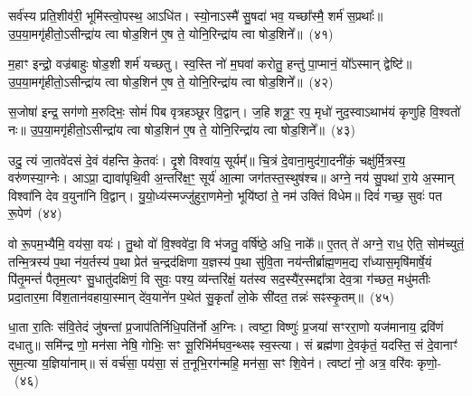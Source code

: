 {\anuvakamend[{असा॑वि स॒प्तविꣳ॑शतिः}]}%

सर्व॑स्य प्रति॒शीव॑री॒ भूमि॑स्त्वो॒पस्थ॒ आ\-ऽधि॑त। स्यो॒ना\-ऽस्मै॑ सु॒षदा॑ भव॒ यच्छा᳚स्मै॒ शर्म॑ स॒प्रथाः᳚॥ उ॒प॒या॒मगृ॑हीतो॒\-ऽसीन्द्रा॑य त्वा षोड॒शिन॑ ए॒ष ते॒ योनि॒रिन्द्रा॑य त्वा षोड॒शिने᳚॥~(४१)\ip

{\anuvakamend[{सर्व॑स्य॒ षड्विꣳ॑शतिः}]}%

म॒हाꣳ इन्द्रो॒ वज्र॑बाहुः षोड॒शी शर्म॑ यच्छतु। स्व॒स्ति नो॑ म॒घवा॑ करोतु॒ हन्तु॑ पा॒प्मानं॒ यो᳚\-ऽस्मान् द्वेष्टि॑॥ उ॒प॒या॒मगृ॑हीतो॒\-ऽसीन्द्रा॑य त्वा षोड॒शिन॑ ए॒ष ते॒ योनि॒रिन्द्रा॑य त्वा षोड॒शिने᳚॥~(४२)\ip

{\anuvakamend[{सर्व॑स्य म॒हान्थ्षड्विꣳ॑शतिः॒ षड्विꣳ॑शतिः}]}%

स॒जोषा॑ इन्द्र॒ सग॑णो म॒रुद्भिः॒ सोमं॑ पिब वृत्रहञ्छूर वि॒द्वान्। ज॒हि शत्रू॒ꣳ॒ रप॒ मृधो॑ नुद॒स्वा\-ऽथाभ॑यं कृणुहि वि॒श्वतो॑ नः॥ उ॒प॒या॒मगृ॑हीतो॒\-ऽसीन्द्रा॑य त्वा षोड॒शिन॑ ए॒ष ते॒ योनि॒रिन्द्रा॑य त्वा षोड॒शिने᳚॥~(४३)\ip

{\anuvakamend[{स॒जोषा᳚स्त्रि॒ꣳ॒शत्}]}%

उदु॒ त्यं जा॒तवे॑दसं दे॒वं व॑हन्ति के॒तवः॑। दृ॒शे विश्वा॑य॒ सूर्यम्᳚॥ चि॒त्रं दे॒वाना॒मुद॑गा॒दनी॑कं॒ चक्षु॑र्मि॒त्रस्य॒ वरु॑णस्या॒ग्नेः। आ\-ऽप्रा॒ द्यावा॑\-पृथि॒वी अ॒न्तरि॑क्ष॒ꣳ॒ सूर्य॑ आ॒त्मा जग॑तस्त॒स्थुष॑श्च॥ अग्ने॒ नय॑ सु॒पथा॑ रा॒ये अ॒स्मान् विश्वा॑नि देव व॒युना॑नि वि॒द्वान्। यु॒यो॒ध्य॑स्मज्जु॑हुरा॒णमेनो॒ भूयि॑ष्ठां ते॒ नम॑ उक्तिं विधेम॥ दिवं॑ गच्छ॒ सुवः॑ पत रू॒पेण॑~(४४)\ip

वो रू॒पम॒भ्यैमि॒ वय॑सा॒ वयः॑। तु॒थो वो॑ वि॒श्ववे॑दा॒ वि भ॑जतु॒ वर्\mbox{}षि॑ष्ठे॒ अधि॒ नाके᳚॥ ए॒तत् ते॑ अग्ने॒ राध॒ ऐति॒ सोम॑च्युतं॒ तन्मि॒त्रस्य॑ प॒था न॑य॒र्तस्य॑ प॒था प्रेत॑ च॒न्द्रद॑क्षिणा य॒ज्ञस्य॑ प॒था सु॑वि॒ता नय॑न्तीर्ब्राह्म॒णम॒द्य रा᳚ध्यास॒मृषि॑मार्\mbox{}षे॒यं पि॑तृ॒मन्तं॑ पैतृम॒त्यꣳ सु॒धातु॑दक्षिणं॒ वि सुवः॒ पश्य॒ व्य॑न्तरि॑क्षं॒ यत॑स्व सद॒स्यै॑र॒स्मद्दा᳚त्रा देव॒त्रा ग॑च्छत॒ मधु॑मतीः प्रदा॒तार॒मा वि॑श॒तान॑वहाया॒स्मान् दे॑व॒याने॑न प॒थेत॑ सु॒कृतां᳚ लो॒के सी॑दत॒ तन्नः॑ सꣴस्कृ॒तम्॥~(४५)\ip

{\anuvakamend[{रू॒पेण॑ सद॒स्यै॑र॒ष्टाद॑श च}]}%

धा॒ता रा॒तिः स॑वि॒तेदं जु॑षन्तां प्र॒जा\-प॑तिर्निधि॒पति॑र्नो अ॒ग्निः। त्वष्टा॒ विष्णुः॑ प्र॒जया॑ सꣳररा॒णो यज॑मानाय॒ द्रवि॑णं दधातु॥ समि॑न्द्र णो॒ मन॑सा नेषि॒ गोभिः॒ सꣳ सू॒रिभि॑र्मघव॒न्थ्सꣴ स्व॒स्त्या। सं ब्रह्म॑णा दे॒वकृ॑तं॒ यदस्ति॒ सं दे॒वानाꣳ॑ सुम॒त्या य॒ज्ञिया॑नाम्॥ सं वर्च॑सा॒ पय॑सा॒ सं त॒नूभि॒रग॑न्महि॒ मन॑सा॒ सꣳ शि॒वेन॑। त्वष्टा॑ नो॒ अत्र॒ वरि॑वः कृणो॒-~(४६)\ip

